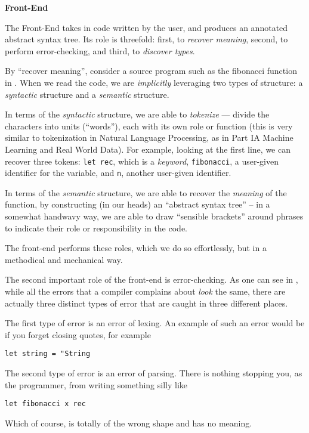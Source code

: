 \begin{minipage}[t]{0.15\textwidth}
    \textbf{\sffamily Front-End}
\end{minipage}%
\begin{minipage}[t]{0.85\textwidth}
    \setlength{\parskip}{.5\baselineskip}
    The Front-End takes in code written by the user, and produces an annotated abstract syntax tree. Its role is threefold: first, to \emph{recover meaning}, second, to perform error-checking, and third, to \emph{discover types}.

    By ``recover meaning'', consider a source program such as the fibonacci function in . When we read the code, we are \emph{implicitly} leveraging two types of structure: a \emph{syntactic} structure and a \emph{semantic} structure.

    In terms of the \emph{syntactic} structure, we are able to \emph{tokenize} --- divide the characters into units (``words''), each with its own role or function (this is very similar to tokenization in Natural Language Processing, as in {\sffamily Part IA Machine Learning and Real World Data}). For example, looking at the first line, we can recover three tokens: \texttt{let rec}, which is a \emph{keyword}, \texttt{fibonacci}, a user-given identifier for the variable, and \texttt{n}, another user-given identifier. 

    In terms of the \emph{semantic} structure, we are able to recover the \emph{meaning} of the function, by constructing (in our heads) an ``abstract syntax tree'' -- in a somewhat handwavy way, we are able to draw ``sensible brackets'' around phrases to indicate their role or responsibility in the code.

    The front-end performs these roles, which we do so effortlessly, but in a methodical and mechanical way. 

    The second important role of the front-end is error-checking. As one can see in , while all the errors that a compiler complains about \emph{look} the same, there are actually three distinct types of error that are caught in three different places. 

    The first type of error is an error of lexing. An example of such an error would be if you forget closing quotes, for example
\begin{verbatim}
let string = "String
\end{verbatim}
    The second type of error is an error of parsing. There is nothing stopping you, as the programmer, from writing something silly like 
\begin{verbatim}
let fibonacci x rec
\end{verbatim}
    Which of course, is totally of the wrong shape and has no meaning. 
\end{minipage}

